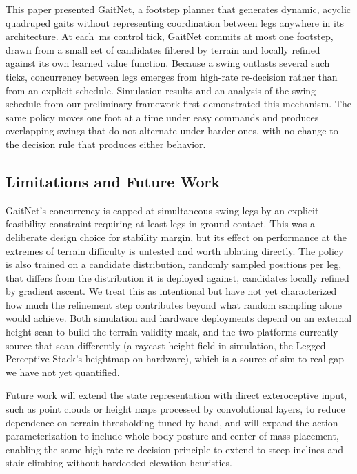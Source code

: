This paper presented GaitNet, a footstep planner that generates
dynamic, acyclic quadruped gaits without representing coordination
between legs anywhere in its architecture. At each
\corlControlTickMs\,ms control tick, GaitNet commits at most one
footstep, drawn from a small set of candidates filtered by terrain and
locally refined against its own learned value function. Because a
swing outlasts several such ticks, concurrency between legs emerges
from high-rate re-decision rather than from an explicit schedule.
 Simulation results and an analysis of the swing schedule from
our preliminary framework \cite{Sullivan2025} first demonstrated this
mechanism. The same policy moves one foot at a time under easy
commands and produces overlapping swings that do not alternate under
harder ones, with no change to the decision rule that produces either
behavior. 

\subsection{Limitations and Future Work}

GaitNet's concurrency is capped at
\numberstringnum{\corlMaxConcurrentSwingLegs} simultaneous swing legs
by an explicit feasibility constraint requiring at least
\numberstringnum{\corlMinContactLegs} legs in ground contact. This was
a deliberate design choice for stability margin, but its effect on
performance at the extremes of terrain difficulty is untested and
worth ablating directly. The policy is also trained on a candidate
distribution, \numberstringnum{\corlTrainCandidatesPerLeg} randomly
sampled positions per leg, that differs from the distribution it is
deployed against, \numberstringnum{\corlCandidatesPerLeg} candidates
locally refined by gradient ascent. We treat this as intentional but
have not yet characterized how much the refinement step contributes
beyond what random sampling alone would achieve. Both simulation and hardware deployments depend on an
external height scan to build the terrain validity mask, and the two
platforms currently source that scan differently (a raycast height
field in simulation, the Legged Perceptive Stack's heightmap on
hardware), which is a source of sim-to-real gap we have not yet
quantified.

Future work will extend the state representation with direct
exteroceptive input, such as point clouds or height maps processed
by convolutional layers, to reduce dependence on terrain thresholding
tuned by hand, and will expand the action parameterization to include
whole-body posture and center-of-mass placement, enabling the same
high-rate re-decision principle to extend to steep inclines and
stair climbing without hardcoded elevation heuristics.
